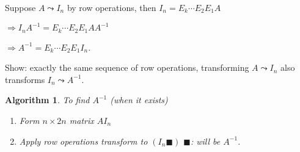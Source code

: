 \documentclass[12pt]{article}
\newtheorem{algorithm}{Algorithm}[subsection]
\begin{document}
Suppose $A \leadsto I_n$ by row operations, then $I_n = E_k \cdots E_2 E_1 A$


$\Rightarrow I_n A^{-1} = E_k \cdots E_2 E_1 A A^{-1}$ 

$\Rightarrow A^{-1} = E_k \cdots E_2 E_1 I_n$. 

Show: exactly the same sequence of row operations, transforming $A \leadsto I_n$
also transforms $I_n \leadsto A^{-1}$. 


\begin{algorithm}
	To find $A^{-1}$ (when it exists) 
	\begin{enumerate}
		\item Form $n \times 2n$ matrix $A I_n$ 
		\item Apply row operations transform to $(I_n  \blacksquare)$ 
			$\blacksquare$: will be $A^{-1}$.  \\
	\end{enumerate}
\end{algorithm}
\end{document}
